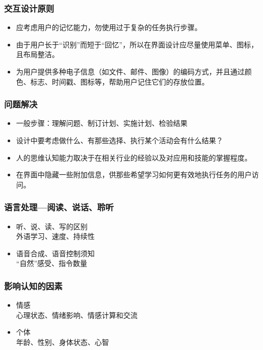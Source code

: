 \documentclass{beamer}
\begin{document}
\begin{frame}
	\frametitle{交互设计原则}
	\beamertemplatetransparentcovereddynamicmedium
	\begin{itemize}[<+->]
		\item 应考虑用户的记忆能力，勿使用过于复杂的任务执行步骤。
		\item 由于用户长于``识别''而短于``回忆''，所以在界面设计应尽量使用菜单、图标，且布局整洁。
		\item 为用户提供多种电子信息（如文件、邮件、图像）的编码方式，并且通过颜色、标志、时间戳、图标等，帮助用户记住它们的存放位置。
	\end{itemize}
\end{frame}

\begin{frame}
	\frametitle{问题解决}
	\beamertemplatetransparentcovereddynamicmedium
	\begin{itemize}[<+->]
		\item 一般步骤：理解问题、制订计划、实施计划、检验结果
		\item 设计中要考虑做什么、有那些选择、执行某个活动会有什么结果？
		\item 人的思维认知能力取决于在相关行业的经验以及对应用和技能的掌握程度。
		\item 在界面中隐藏一些附加信息，供那些希望学习如何更有效地执行任务的用户访问。
	\end{itemize}
\end{frame}

\begin{frame}
	\frametitle{语言处理—阅读、说话、聆听}
	\beamertemplatetransparentcovereddynamicmedium
	\begin{itemize}[<+->]
		\item 听、说、读、写的区别\\{\tiny 外语学习、速度、持续性}
		\item 语音合成、语音控制须知\\{\tiny ``自然''感受、指令数量}
	\end{itemize}
\end{frame}

\begin{frame}
	\frametitle{影响认知的因素}
	\beamertemplatetransparentcovereddynamicmedium
	\begin{itemize}[<+->]
		\item 情感\\{\tiny 心理状态、情绪影响、情感计算和交流}
		\item 个体\\{\tiny 年龄、性别、身体状态、心智}
	\end{itemize}
\end{frame}
\end{document}
